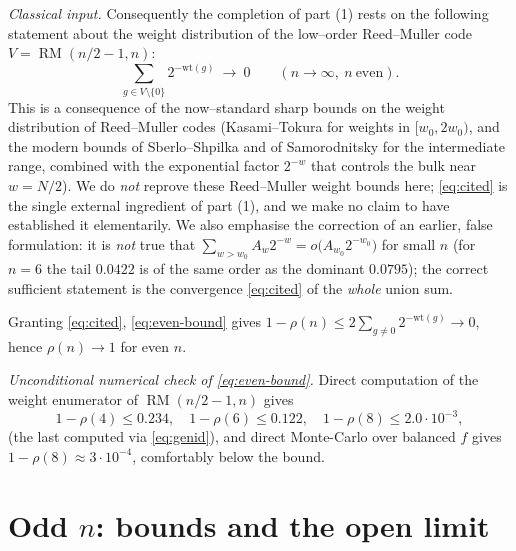 \documentclass{amsart}
\theoremstyle{definition}
\DeclareMathOperator{\RM}{RM}
\begin{document}
\emph{Classical input.} Consequently the completion of part (1) rests on
the following statement about the weight distribution of the low--order
Reed--Muller code $V=\RM(n/2-1,n)$:
\begin{equation}\label{eq:cited}
\sum_{g\in V\setminus\{0\}}2^{-\mathrm{wt}(g)}\ \longrightarrow\ 0
\qquad(n\to\infty,\ n\ \text{even}).
\end{equation}
This is a consequence of the now--standard sharp bounds on the weight
distribution of Reed--Muller codes (Kasami--Tokura for weights in
$[w_0,2w_0)$, and the modern bounds of Sberlo--Shpilka and of Samorodnitsky
for the intermediate range, combined with the exponential factor $2^{-w}$
that controls the bulk near $w=N/2$). We do \emph{not} reprove these
Reed--Muller weight bounds here; \eqref{eq:cited} is the single external
ingredient of part (1), and we make no claim to have established it
elementarily. We also emphasise the correction of an earlier, false
formulation: it is \emph{not} true that
$\sum_{w>w_0}A_w2^{-w}=o\bigl(A_{w_0}2^{-w_0}\bigr)$ for small $n$ (for
$n=6$ the tail $0.0422$ is of the same order as the dominant $0.0795$);
the correct sufficient statement is the convergence \eqref{eq:cited} of the
\emph{whole} union sum.

Granting \eqref{eq:cited}, \eqref{eq:even-bound} gives
$1-\rho(n)\le 2\sum_{g\ne0}2^{-\mathrm{wt}(g)}\to0$, hence $\rho(n)\to1$
for even $n$.

\emph{Unconditional numerical check of \eqref{eq:even-bound}.} Direct
computation of the weight enumerator of $\RM(n/2-1,n)$ gives
\[
1-\rho(4)\le 0.234,\quad 1-\rho(6)\le 0.122,\quad 1-\rho(8)\le 2.0\cdot10^{-3},
\]
(the last computed via \eqref{eq:genid}), and direct Monte-Carlo over
balanced $f$ gives $1-\rho(8)\approx 3\cdot10^{-4}$, comfortably below the
bound.

\section{Odd $n$: bounds and the open limit}\label{sec:odd-asy}
\end{document}
